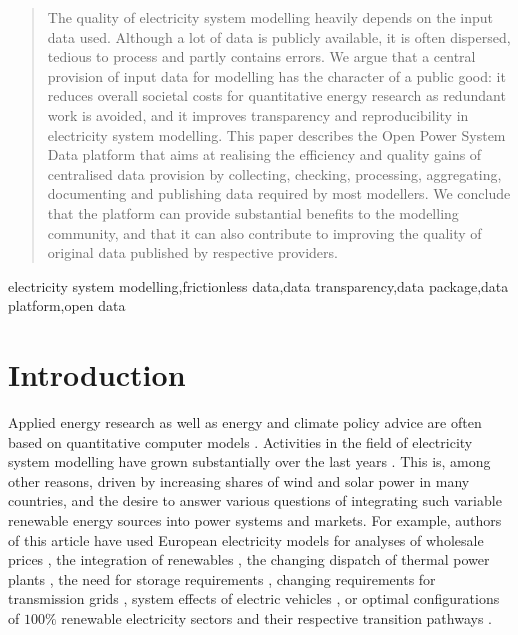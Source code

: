 \documentclass[article,sort&compress]{elsarticle}
\begin{document}
\begin{frontmatter}
\begin{abstract}
    The quality of electricity system modelling heavily depends on the input data used. Although a lot of data is publicly available, it is often dispersed, tedious to process and partly contains errors. We argue that a central provision of input data for modelling has the character of a public good: it reduces overall societal costs for quantitative energy research as redundant work is avoided, and it improves transparency and reproducibility in electricity system modelling. This paper describes the Open Power System Data platform that aims at realising the efficiency and quality gains of centralised data provision by collecting, checking, processing, aggregating, documenting and publishing data required by most modellers. We conclude that the platform can provide substantial benefits to the modelling community, and that it can also contribute to improving the quality of original data published by respective providers.
\end{abstract}

\begin{keyword}
electricity system modelling\sep frictionless data\sep data transparency\sep data package\sep data platform\sep open data
\end{keyword}

\end{frontmatter}

\linenumbers

\section{Introduction}
\label{intro}
Applied energy research as well as energy and climate policy advice are often based on quantitative computer models \cite{Pfenninger2014,DeCarolis2017}. Activities in the field of electricity system modelling \cite{Connolly2010,Ringkjob2018} have grown substantially over the last years \cite{Hall2016,Carramolino2017}. This is, among other reasons, driven by increasing shares of wind and solar power in many countries, and the desire to answer various questions of integrating such variable renewable energy sources into power systems and markets. For example, authors of this article have used European electricity models for analyses of wholesale prices \citep{Hirth2018}, the integration of renewables \cite{Kunz2013}, the changing dispatch of thermal power plants \citep{Schill2017b}, the need for storage requirements \citep{Schill2018}, changing requirements for transmission grids \citep{Egerer2014,Schlecht2015,Kunz2018,egerer_2016,GERBAULET2018228}, system effects of electric vehicles \citep{Schill2015}, or optimal configurations of $100\%$ renewable electricity sectors and their respective transition pathways \cite{Wiese2014}.
\end{document}
